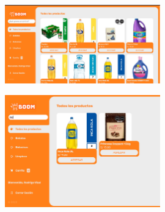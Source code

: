 \documentclass{article}
\begin{document}
	\begin{figure}[H]
		\centering
		\includegraphics[width=0.6\textwidth,keepaspectratio]{img/5.png}
	\end{figure}
	\begin{figure}[H]
		\centering
		\includegraphics[width=0.6\textwidth,keepaspectratio]{img/6.png}
	\end{figure}
\end{document}
